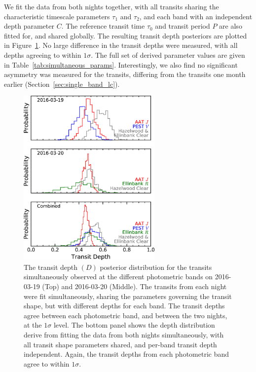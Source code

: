 \documentclass[iop,useAMES,usenatbig]{emulateapj}
\begin{document}
We fit the data from both nights together, with all transits sharing the characteristic timescale parameters $\tau_1$ and $\tau_2$, and each band with an independent depth parameter $C$. The reference transit time $\tau_0$ and transit period $P$ are also fitted for, and shared globally. The resulting transit depth posteriors are plotted in Figure~\ref{fig:depth_hist}. No large difference in the transit depths were measured, with all depths agreeing to within $1\sigma$. The full set of derived parameter values are given in Table~\ref{tab:simultaneous_params}. Interestingly, we also find no significant asymmetry was measured for the transits, differing from the transits one month earlier (Section~\ref{sec:single_band_lc}). 

\begin{figure}
    \centering
    \includegraphics[width=7cm]{plots/depth_hist.eps}
    \caption{The transit depth $(D)$ posterior distribution for the transits simultaneously observed at the different photometric bands on 2016-03-19 (Top) and 2016-03-20 (Middle). The transits from each night were fit simultaneously, sharing the parameters governing the transit shape, but with different depths for each band. The transit depths agree between each photometric band, and between the two nights, at the $1\sigma$ level. The bottom panel shows the depth distribution derive from fitting the data from both nights simultaneously, with all transit shape parameters shared, and per-band transit depth independent. Again, the transit depths from each photometric band agree to within $1\sigma$.}
    \label{fig:depth_hist}
\end{figure}
\end{document}
